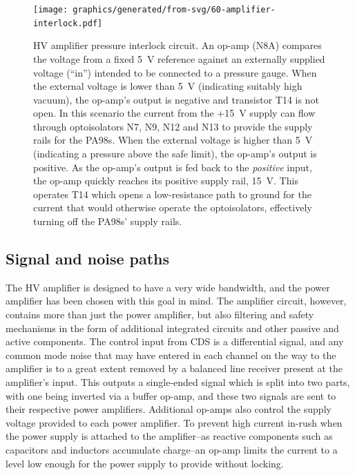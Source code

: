 
\begin{figure}
  \centering
  \texttt{[image: graphics/generated/from-svg/60-amplifier-interlock.pdf]}
  \caption[High voltage amplifier pressure interlock circuit]{\label{fig:amplifier-interlock}HV amplifier pressure interlock circuit. An op-amp (N8A) compares the voltage from a fixed \SI{5}{\volt} reference against an externally supplied voltage (``in'') intended to be connected to a pressure gauge. When the external voltage is lower than \SI{5}{\volt} (indicating suitably high vacuum), the op-amp's output is negative and transistor T14 is not open. In this scenario the current from the +\SI{15}{\volt} supply can flow through optoisolators N7, N9, N12 and N13 to provide the supply rails for the PA98s. When the external voltage is higher than \SI{5}{\volt} (indicating a pressure above the safe limit), the op-amp's output is positive. As the op-amp's output is fed back to the \emph{positive} input, the op-amp quickly reaches its positive supply rail, \SI{15}{\volt}. This operates T14 which opens a low-resistance path to ground for the current that would otherwise operate the optoisolators, effectively turning off the PA98s' supply rails.}
\end{figure}

\subsection{\label{sec:signal-and-noise-paths}Signal and noise paths}
The \gls{HV} amplifier is designed to have a very wide bandwidth, and the power amplifier has been chosen with this goal in mind. The amplifier circuit, however, contains more than just the power amplifier, but also filtering and safety mechanisms in the form of additional integrated circuits and other passive and active components. The control input from \gls{CDS} is a differential signal, and any common mode noise that may have entered in each channel on the way to the amplifier is to a great extent removed by a balanced line receiver present at the amplifier's input. This outputs a single-ended signal which is split into two parts, with one being inverted via a buffer op-amp, and these two signals are sent to their respective power amplifiers. Additional op-amps also control the supply voltage provided to each power amplifier. To prevent high current in-rush when the power supply is attached to the amplifier--as reactive components such as capacitors and inductors accumulate charge--an op-amp limits the current to a level low enough for the power supply to provide without locking.

